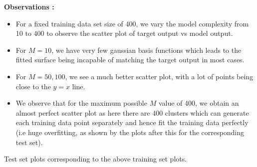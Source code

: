 \documentclass{article}
\begin{document}
\textbf{Observations : \newline}
\begin{itemize}
\item For a fixed training data set size of 400, we vary the model complexity from 10 to 400 to observe the scatter plot of target output vs model output.
\item For $M= 10$, we have very few gaussian basis functions which leads to the fitted surface being incapable of matching the target output in most cases. 

\item For $M = 50,100$, we see a much better scatter plot, with a lot of points being close to the $y = x$ line.

\item We observe that for the maximum possible $M$ value of 400, we obtain an almost perfect scatter plot as here there are 400 clusters which can generate each training data point separately and hence fit the training data perfectly (i.e huge overfitting, as shown by the plots after this for the corresponding test set).

\end{itemize}
\newpage
Test set plots corresponding to the above training set plots.
\end{document}
